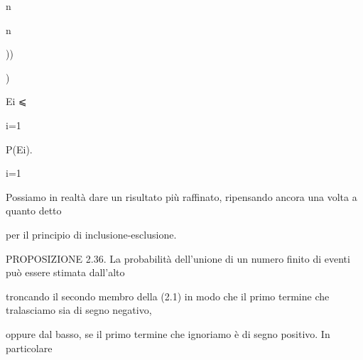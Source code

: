 \documentclass[a4paper,portrait,12pt]{article}
\begin{document}
\begin{flushleft}
n
\end{flushleft}





\begin{flushleft}
n
\end{flushleft}





))


)





\begin{flushleft}
Ei ⩽
\end{flushleft}





\begin{flushleft}
i=1
\end{flushleft}





\begin{flushleft}
P(Ei).
\end{flushleft}


\begin{flushleft}
i=1
\end{flushleft}





\begin{flushleft}
Possiamo in realt\`{a} dare un risultato più raffinato, ripensando ancora una volta a quanto detto
\end{flushleft}


\begin{flushleft}
per il principio di inclusione-esclusione.
\end{flushleft}


\begin{flushleft}
PROPOSIZIONE 2.36. La probabilit\`{a} dell'unione di un numero finito di eventi pu\`{o} essere stimata dall'alto
\end{flushleft}


\begin{flushleft}
troncando il secondo membro della (2.1) in modo che il primo termine che tralasciamo sia di segno negativo,
\end{flushleft}


\begin{flushleft}
oppure dal basso, se il primo termine che ignoriamo \`{e} di segno positivo. In particolare
\end{flushleft}
\end{document}
